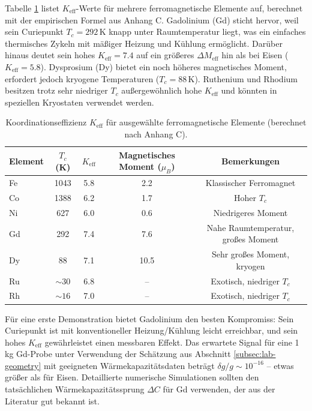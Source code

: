 \documentclass[12pt]{article}
\theoremstyle{remark}
\newcommand{\Keff}{K_{\mathrm{eff}}}
\begin{document}
	Tabelle \ref{tab:ferro-keff-appP} listet \(\Keff\)-Werte für mehrere ferromagnetische Elemente auf, berechnet mit der empirischen Formel aus Anhang C. Gadolinium (Gd) sticht hervor, weil sein Curiepunkt \(T_c = 292\,\mathrm{K}\) knapp unter Raumtemperatur liegt, was ein einfaches thermisches Zykeln mit mäßiger Heizung und Kühlung ermöglicht. Darüber hinaus deutet sein hohes \(\Keff = 7.4\) auf ein größeres \(\Delta M_{\mathrm{eff}}\) hin als bei Eisen (\(\Keff = 5.8\)). Dysprosium (Dy) bietet ein noch höheres magnetisches Moment, erfordert jedoch kryogene Temperaturen (\(T_c = 88\,\mathrm{K}\)). Ruthenium und Rhodium besitzen trotz sehr niedriger \(T_c\) außergewöhnlich hohe \(\Keff\) und könnten in speziellen Kryostaten verwendet werden.
	
	\begin{table}[htbp]
		\centering
		\caption{Koordinationseffizienz \(\Keff\) für ausgewählte ferromagnetische Elemente (berechnet nach Anhang C).}
		\label{tab:ferro-keff-appP}
		\begin{tabular}{lcccc}
			\toprule
			Element & \(T_c\) (K) & \(\Keff\) & Magnetisches Moment (\(\mu_B\)) & Bemerkungen \\
			\midrule
			Fe & 1043 & 5.8 & 2.2 & Klassischer Ferromagnet \\
			Co & 1388 & 6.2 & 1.7 & Hoher \(T_c\) \\
			Ni & 627  & 6.0 & 0.6 & Niedrigeres Moment \\
			Gd & 292  & 7.4 & 7.6 & Nahe Raumtemperatur, großes Moment \\
			Dy & 88   & 7.1 & 10.5 & Sehr großes Moment, kryogen \\
			Ru & \(\sim 30\) & 6.8 & -- & Exotisch, niedriger \(T_c\) \\
			Rh & \(\sim 16\) & 7.0 & -- & Exotisch, niedriger \(T_c\) \\
			\bottomrule
		\end{tabular}
	\end{table}
	
	Für eine erste Demonstration bietet Gadolinium den besten Kompromiss: Sein Curiepunkt ist mit konventioneller Heizung/Kühlung leicht erreichbar, und sein hohes \(\Keff\) gewährleistet einen messbaren Effekt. Das erwartete Signal für eine 1 kg Gd-Probe unter Verwendung der Schätzung aus Abschnitt \ref{subsec:lab-geometry} mit geeigneten Wärmekapazitätsdaten beträgt $\delta g/g \sim 10^{-16}$ – etwas größer als für Eisen. Detaillierte numerische Simulationen sollten den tatsächlichen Wärmekapazitätssprung \(\Delta C\) für Gd verwenden, der aus der Literatur gut bekannt ist.
	
\end{document}
